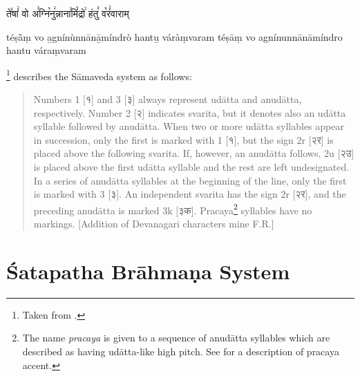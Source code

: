 \begin{exe}
\ex
\begin{xlist}
\ex \begin{devfont}ते꣡षां꣢ वो अ꣣ग्नि꣡नु꣢न्नाना꣣मिं꣡द्रो꣢ हंतु꣣ व꣡रं꣢वाराम्\end{devfont}
\ex téṣā̀ṃ vo a̲gnínùnnānā̲míndrò hantu̲ váràṃvaram
\ex téṣāṃ vo agnínunnānāmíndro hantu váraṃvaram
\end{xlist}
\end{exe}


\citet[p.~228-229]{Howard1986}\footnote{Taken from \citet[p.~3]{EversonScharf2007}.} describes the Sāmaveda system as follows:

\begin{quote}Numbers 1 [{\devfont १}] and 3 [{\devfont ३}] always represent udātta and anudātta, respectively. Number 2 [{\devfont २}] indicates svarita, but it denotes also an udātta syllable followed by anudātta. When two or more udātta syllables appear in succession, only the first is marked with 1 [{\devfont १}], but the sign 2r [{\devfont २र}] is placed above the following svarita. If, however, an anudātta follows, 2u [{\devfont २उ}] is placed above the first udātta syllable and the rest are left undesignated. In a series of anudātta syllables at the beginning of the line, only the first is marked with 3 [{\devfont ३}]. An independent svarita has the sign 2r [{\devfont २र}], and the preceding anudātta is marked 3k [{\devfont ३क}]. Pracaya\footnote{The name \emph{pracaya} is given to a sequence of anudātta syllables which are described as having udātta-like high pitch. See \citet{Whitney1869} for a description of pracaya accent.} syllables have no markings. [Addition of Devanagari characters mine F.R.]\end{quote}

\section{Śatapatha Brāhmaṇa System}

